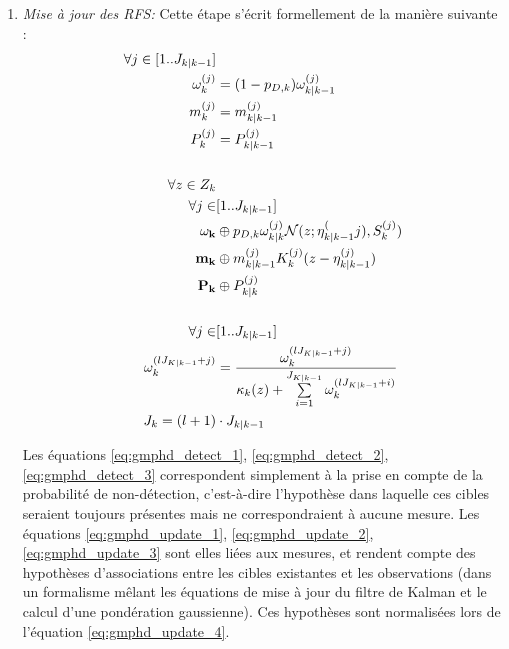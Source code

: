 \begin{enumerate}
	\item{\emph{Mise à jour des RFS:}}
		Cette étape s'écrit formellement de la manière suivante :
		\begin{align}
			\forall j \in [1 .. J_{k|k-1}]& 								\notag \\
				\omega_k^{(j)} 	&= (1 - p_{D,k}) \omega_{k|k-1}^{(j)} \label{eq:gmphd_detect_1}\\
				m_k^{(j)}				&= m_{k|k-1}^{(j)} 										\label{eq:gmphd_detect_2}\\
				P_k^{(j)}				&= P_{k|k-1}^{(j)}										\label{eq:gmphd_detect_3}\\ 
			\notag \\
			\forall z \in Z_k& 								\notag 	\\
				\forall j \in &[1 .. J_{k|k-1}] \notag 	\\
					\mathbf{\omega_k} &\oplus p_{D,k} \omega_{k|k}^{(j)} \mathcal{N} (z; \eta_{k|k-1}^(j), S_k^{(j)}) \label{eq:gmphd_update_1}\\
					\mathbf{m_k}			&\oplus m_{k|k-1}^{(j)} K_k^{(j)} (z - \eta_{k|k-1}^{(j)}) 											\label{eq:gmphd_update_2}\\
					\mathbf{P_k}			&\oplus P_{k|k}^{(j)} 																													\label{eq:gmphd_update_3}\\ 
				\notag \\
				\forall j \in &[1 .. J_{k|k-1}] \notag 	\\
					\omega_k^{(l J_{K|k-1} +j)} &= \frac{\omega_k^{(l J_{K|k-1} +j)}}{ \kappa_k(z) + \sum\limits_{i=1}^{J_{K|k-1}}\omega_k^{(l J_{K|k-1} +i)} } \label{eq:gmphd_update_4}\\
				J_k = (l+1)& \cdot J_{k|k-1} \label{eq:gmphd_update_5}
		\end{align}
		
		Les équations \ref{eq:gmphd_detect_1}, \ref{eq:gmphd_detect_2}, \ref{eq:gmphd_detect_3} correspondent simplement à la prise en compte de la probabilité de non-détection, c'est-à-dire l'hypothèse dans laquelle ces cibles seraient toujours présentes mais ne correspondraient à aucune mesure. Les équations \ref{eq:gmphd_update_1}, \ref{eq:gmphd_update_2}, \ref{eq:gmphd_update_3} sont elles liées aux mesures, et rendent compte des hypothèses d'associations entre les cibles existantes et les observations (dans un formalisme mêlant les équations de mise à jour du filtre de Kalman et le calcul d'une pondération gaussienne). Ces hypothèses sont normalisées lors de l'équation \ref{eq:gmphd_update_4}.
\end{enumerate}

